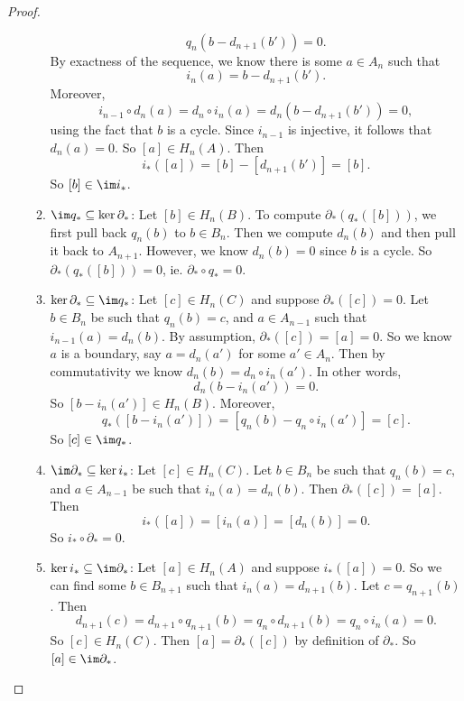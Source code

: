 \documentclass[a4paper]{article}
\begin{document}
\begin{proof}
\begin{enumerate}
\begin{enumerate}
          \[
            q_n (b - d_{n + 1}(b')) = 0.
          \]
          By exactness of the sequence, we know there is some $a \in A_n$ such that
          \[
            i_n(a) = b - d_{n + 1}(b').
          \]
          Moreover,
          \[
            i_{n - 1} \circ d_n(a) = d_n \circ i_n (a) = d_n(b - d_{n + 1}(b')) = 0,
          \]
          using the fact that $b$ is a cycle. Since $i_{n - 1}$ is injective, it follows that $d_n(a) = 0$. So $[a] \in H_n(A)$. Then
          \[
            i_*([a]) = [b] - [d_{n + 1}(b')] = [b].
          \]
          So $[b] \in \im i_*$.
        \item $\im q_* \subseteq \ker \partial_*$: Let $[b] \in H_n(B)$. To compute $\partial_*(q_*([b]))$, we first pull back $q_n(b)$ to $b \in B_n$. Then we compute $d_n(b)$ and then pull it back to $A_{n + 1}$. However, we know $d_n(b) = 0$ since $b$ is a cycle. So $\partial_*(q_*([b])) = 0$, ie. $\partial_* \circ q_* = 0$.
        \item $\ker \partial_* \subseteq \im q_*$: Let $[c] \in H_n(C)$ and suppose $\partial_*([c]) = 0$. Let $b \in B_n$ be such that $q_n(b) = c$, and $a \in A_{n - 1}$ such that $i_{n - 1}(a) = d_n(b)$. By assumption, $\partial_*([c]) = [a] = 0$. So we know $a$ is a boundary, say $a = d_n (a')$ for some $a' \in A_n$. Then by commutativity we know $d_n(b) = d_n \circ i_n (a')$. In other words,
          \[
            d_n(b - i_n(a')) = 0.
          \]
          So $[b - i_n(a')] \in H_n(B)$. Moreover,
          \[
            q_*([b - i_n(a')]) = [q_n(b) - q_n \circ i_n(a')] = [c].
          \]
          So $[c] \in \im q_*$.
        \item $\im \partial_* \subseteq \ker i_*$: Let $[c] \in H_n(C)$. Let $b \in B_n$ be such that $q_n(b) = c$, and $a \in A_{n - 1}$ be such that $i_n(a) = d_n(b)$. Then $\partial_*([c]) = [a]$. Then
          \[
            i_*([a]) = [i_n(a)] = [d_n(b)] = 0.
          \]
          So $i_* \circ \partial_* = 0$.
        \item $\ker i_* \subseteq \im \partial_*$: Let $[a] \in H_n(A)$ and suppose $i_*([a]) = 0$. So we can find some $b \in B_{n + 1}$ such that $i_n(a) = d_{n + 1}(b)$. Let $c = q_{n + 1}(b)$. Then
          \[
            d_{n + 1}(c) = d_{n + 1}\circ q_{n + 1} (b) = q_n \circ d_{n + 1}(b) = q_n \circ i_n (a) = 0.
          \]
          So $[c] \in H_n(C)$. Then $[a] = \partial_*([c])$ by definition of $\partial_*$. So $[a] \in \im \partial_*$.
      \end{enumerate}
  \end{enumerate}
\end{proof}
\end{document}
